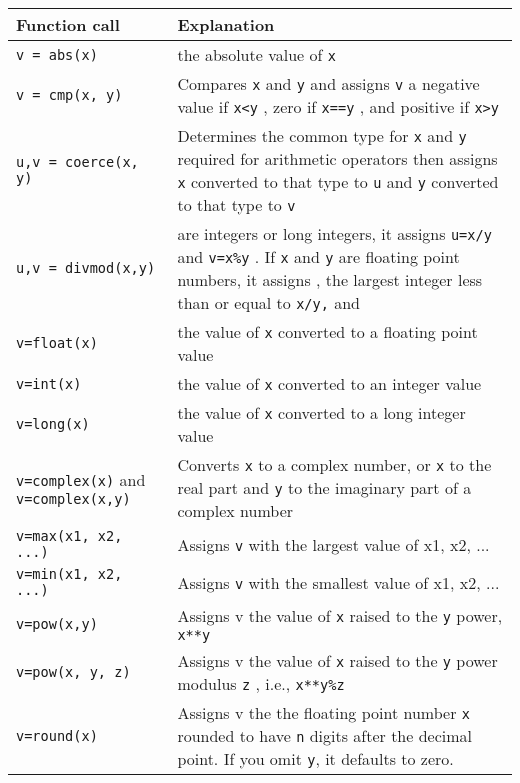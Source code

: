 \begin{longtable}{l|p{7cm}}
\toprule
Function call & Explanation \\
%
\midrule
\verb"v = abs(x)" & the absolute value of \texttt{x} \\
%
\midrule
\verb"v = cmp(x, y)" & Compares \texttt{x} and \texttt{y} and
assigns \texttt{v} a negative value if \texttt{x\textless{}y} , zero if
\texttt{x==y} , and positive if \texttt{x\textgreater{}y} \\
%
\midrule
\verb"u,v = coerce(x, y)" & Determines the common type for
\texttt{x} and \texttt{y} required for arithmetic operators then assigns
\texttt{x} converted to that type to \texttt{u} and \texttt{y} converted to
that type to \texttt{v} \\
%
\midrule
\verb"u,v = divmod(x,y)" & are integers or long integers, it assigns \texttt{u=x/y} and \texttt{v=x\%y} .
If \texttt{x} and \texttt{y} are floating point numbers, it assigns
, the largest integer less than or equal to \texttt{x/y,} and \\
%
\midrule
\verb"v=float(x)" & the value of \texttt{x} converted to a floating point value \\
%
\midrule
\verb"v=int(x)" & the value of \texttt{x} converted to an integer value \\
%
\midrule
\verb"v=long(x)" & the value of \texttt{x} converted to a long integer value \\
%
\midrule
\verb"v=complex(x)" and \verb"v=complex(x,y)" & Converts \texttt{x} to a complex
number, or \texttt{x} to the real part and \texttt{y} to the imaginary part of a complex number \\
%
\midrule
\verb"v=max(x1, x2, ...)"  &  Assigns \texttt{v}  with the largest value of x1, x2, ... \\
%
\midrule
\verb"v=min(x1, x2, ...)"  &  Assigns \texttt{v}  with the smallest value of x1, x2, ... \\
%
\midrule
\verb"v=pow(x,y)"  & Assigns v the value of \texttt{x} raised to the \texttt{y} power, \texttt{x**y} \\
%
\midrule
\verb"v=pow(x, y, z)" & Assigns v  the value of \texttt{x} raised to the \texttt{y} power modulus \texttt{z} , i.e., \texttt{x**y\%z} \\
%
\midrule
\verb"v=round(x)" &  Assigns v the the floating point number \texttt{x} rounded to have \texttt{n} digits after the decimal
point. If you omit \texttt{y}, it defaults to zero. \\
%
\bottomrule
\end{longtable}

